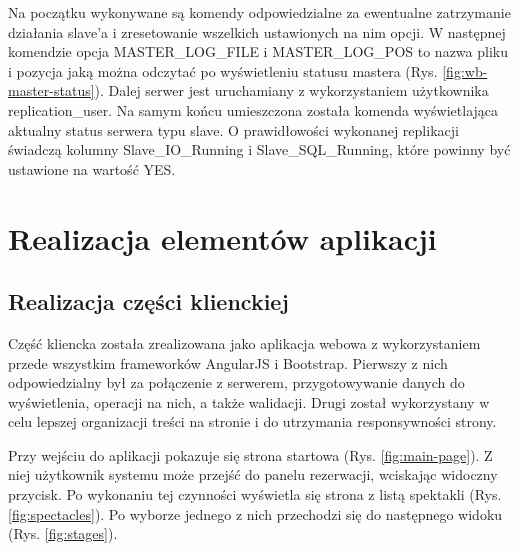 \documentclass{mgr}
\begin{document}
Na początku wykonywane są komendy odpowiedzialne za ewentualne zatrzymanie działania slave'a i zresetowanie wszelkich ustawionych na nim opcji. W następnej komendzie opcja MASTER\_LOG\_FILE i MASTER\_LOG\_POS to nazwa pliku i pozycja jaką można odczytać po wyświetleniu statusu mastera (Rys. \ref{fig:wb-master-status}). Dalej serwer jest uruchamiany z wykorzystaniem użytkownika replication\_user. Na samym końcu umieszczona została komenda wyświetlająca aktualny status serwera typu slave. O prawidłowości wykonanej replikacji świadczą kolumny Slave\_IO\_Running i Slave\_SQL\_Running, które powinny być ustawione na wartość YES.

\section{Realizacja elementów aplikacji}

\subsection{Realizacja części klienckiej}
Część kliencka została zrealizowana jako aplikacja webowa z wykorzystaniem przede wszystkim frameworków AngularJS i Bootstrap. Pierwszy z nich odpowiedzialny był za połączenie z serwerem, przygotowywanie danych do wyświetlenia, operacji na nich, a także walidacji. Drugi został wykorzystany w celu lepszej organizacji treści na stronie i do utrzymania responsywności strony.

Przy wejściu do aplikacji pokazuje się strona startowa (Rys. \ref{fig:main-page}). Z niej użytkownik systemu może przejść do panelu rezerwacji, wciskając widoczny przycisk. Po wykonaniu tej czynności wyświetla się strona z listą spektakli (Rys. \ref{fig:spectacles}). Po wyborze jednego z nich przechodzi się do następnego widoku (Rys. \ref{fig:stages}). 
\end{document}
